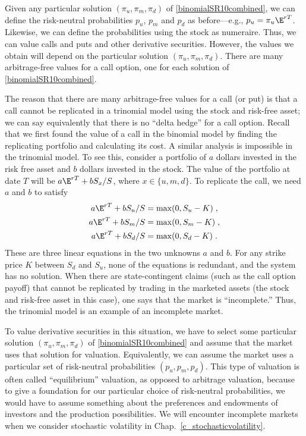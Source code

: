 Given any particular solution $(\pi_u,\pi_m,\pi_d)$ of  \eqref{binomialSR10combined}, we can define the risk-neutral probabilities $p_u$, $p_m$ and $p_d$ as before---e.g., $p_u = \pi_u\E^{rT}$.  Likewise, we can define the probabilities using the stock as numeraire.  Thus, we can value calls and puts and other derivative securities.  However, the values we obtain will depend on the particular solution $(\pi_u,\pi_m,\pi_d)$.  There are many arbitrage-free values for a call option, one for each solution of \eqref{binomialSR10combined}.

The reason that there are many arbitrage-free values for a call (or put) is that a call cannot be replicated in a trinomial model using the stock and risk-free asset; we can say equivalently that there is no ``delta hedge'' for a call option.  Recall that we first found the value of a call in the binomial model by finding the replicating portfolio and calculating its cost.  A similar analysis is impossible in the trinomial model.  To see this, consider a portfolio of $a$ dollars invested in the risk free asset and $b$ dollars invested in the stock.  The value of the portfolio at date $T$ will be $a\E^{rT} + bS_x/S$, where $x \in \{u,m,d\}$.  To replicate the call, we need $a$ and $b$ to satisfy
\begin{subequations}\begin{align}
a\E^{rT} + bS_u/S &= \max(0,S_u-K)\; ,\\
a\E^{rT} + bS_m/S &= \max(0,S_m-K)\; ,\\
a\E^{rT} + bS_d/S &= \max(0,S_d-K)\;.
\end{align}\end{subequations}
These are three linear equations in the two unknowns $a$ and $b$.  For any strike price $K$ between $S_d$ and $S_u$, none of the equations is redundant, and the system has no solution.  When there are state-contingent claims (such as the call option payoff) that cannot be replicated by trading in the marketed assets (the stock and risk-free asset in this case), one says that the market is ``incomplete.''  Thus, the trinomial model is an example of an incomplete market. 

To value derivative securities in this situation, we have to select some particular solution $(\pi_u,\pi_m,\pi_d)$ of  \eqref{binomialSR10combined} and assume that the market uses that solution for valuation.  Equivalently, we can assume the market uses a particular set of risk-neutral probabilities $(p_u, p_m, p_d)$.  This type of valuation is often called ``equilibrium'' valuation,  as opposed to arbitrage valuation, because to give a foundation for our particular choice of risk-neutral probabilities, we would have to assume something about the preferences and endowments of investors and the production possibilities.  We will encounter incomplete markets when we consider stochastic volatility in Chap.~\ref{c_stochasticvolatility}.


